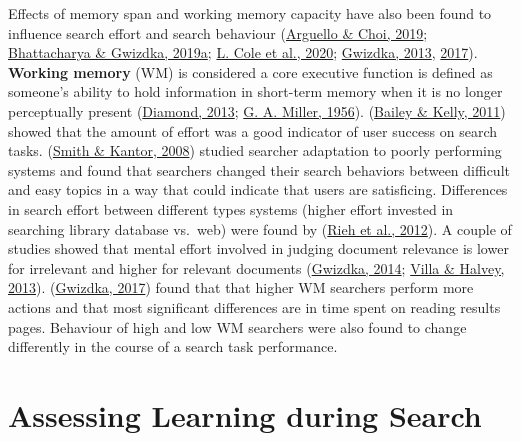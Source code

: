 \documentclass[a4paper, nobind]{templates/ociamthesis}
\begin{document}
Effects of memory span and working memory capacity have also been found
to influence search effort and search behaviour
(\protect\hyperlink{ref-arguello2019effects}{Arguello \& Choi, 2019}; \protect\hyperlink{ref-CHIIR19}{Bhattacharya \& Gwizdka, 2019a}; \protect\hyperlink{ref-cole2020more}{L. Cole et al., 2020}; \protect\hyperlink{ref-gwizdka2013effects}{Gwizdka, 2013}, \protect\hyperlink{ref-gwizdka2017can}{2017}).
\textbf{Working memory} (WM) is considered a core executive function is
defined as someone's ability to hold information in short-term memory
when it is no longer perceptually present
(\protect\hyperlink{ref-diamond2013executive}{Diamond, 2013}; \protect\hyperlink{ref-miller1956magical}{G. A. Miller, 1956}). (\protect\hyperlink{ref-bailey2011amount}{Bailey \& Kelly, 2011}) showed
that the amount of effort was a good indicator of user success on search
tasks. (\protect\hyperlink{ref-smith2008user}{Smith \& Kantor, 2008}) studied searcher adaptation to poorly performing
systems and found that searchers changed their search behaviors between
difficult and easy topics in a way that could indicate that users are
satisficing. Differences in search effort between different types
systems (higher effort invested in searching library database vs.~web)
were found by (\protect\hyperlink{ref-rieh2012amount}{Rieh et al., 2012}). A couple of studies showed that mental
effort involved in judging document relevance is lower for irrelevant
and higher for relevant documents (\protect\hyperlink{ref-37}{Gwizdka, 2014}; \protect\hyperlink{ref-villa2013relevance}{Villa \& Halvey, 2013}).
(\protect\hyperlink{ref-gwizdka2017can}{Gwizdka, 2017}) found that that higher WM searchers perform more
actions and that most significant differences are in time spent on
reading results pages. Behaviour of high and low WM searchers were also
found to change differently in the course of a search task performance.

\hypertarget{assessing-learning-during-search}{%
\section{Assessing Learning during Search}\label{assessing-learning-during-search}}
\end{document}
